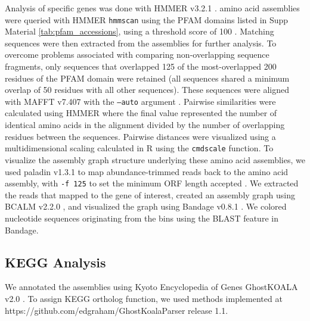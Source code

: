Analysis of specific genes was done with HMMER v3.2.1
\cite{hmmer}. \plass amino acid assemblies were queried with HMMER {\tt hmmscan}
 using the PFAM domains listed in Supp Material \ref{tab:pfam_accessions}, 
using a threshold score of 100 \cite{pfam}. Matching sequences were then
extracted from the assemblies for further analysis. To overcome
problems associated with comparing non-overlapping sequence fragments,
only sequences that overlapped 125 of the most-overlapped 200 residues
of the PFAM domain were retained (all sequences shared a minimum
overlap of 50 residues with all other sequences). These sequences were
aligned with MAFFT v7.407 with the {\tt --auto} argument \cite{mafft}. Pairwise similarities were
calculated using HMMER where the final value represented the number of
identical amino acids in the alignment divided by the number of
overlapping residues between the sequences. Pairwise distances were
visualized using a multidimensional scaling calculated in R using the
{\tt cmdscale} function. To visualize the assembly graph structure
underlying these amino acid assemblies, we used paladin v1.3.1 
to map abundance-trimmed reads back to the \plass amino acid assembly,
with {\tt -f 125} to set the minimum ORF length accepted \cite{paladin}. 
We extracted the reads that mapped to the gene of interest, created an
assembly graph using BCALM v2.2.0 \cite{chikhi2016compacting}, and
visualized the graph using Bandage v0.8.1 \cite{bandage}. We colored
nucleotide sequences originating from the bins using the BLAST feature
in Bandage.

\subsection*{KEGG Analysis}

We annotated the \plass assemblies using Kyoto Encyclopedia of Genes
GhostKOALA v2.0 \cite{kegg}. To assign KEGG ortholog function, we used
methods implemented at https://github.com/edgraham/GhostKoalaParser
release 1.1.
